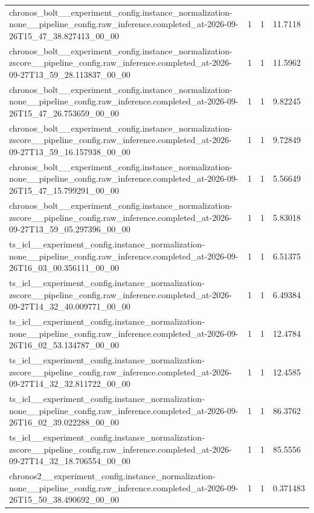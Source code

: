 \begin{tabular}{llll}
chronos\_bolt\_\_experiment\_config.instance\_normalization-none\_\_pipeline\_config.raw\_inference.completed\_at-2026-09-26T15\_47\_38.827413\_00\_00 & 1 & 1 & 11.7118 \\
chronos\_bolt\_\_experiment\_config.instance\_normalization-zscore\_\_pipeline\_config.raw\_inference.completed\_at-2026-09-27T13\_59\_28.113837\_00\_00 & 1 & 1 & 11.5962 \\
chronos\_bolt\_\_experiment\_config.instance\_normalization-none\_\_pipeline\_config.raw\_inference.completed\_at-2026-09-26T15\_47\_26.753659\_00\_00 & 1 & 1 & 9.82245 \\
chronos\_bolt\_\_experiment\_config.instance\_normalization-zscore\_\_pipeline\_config.raw\_inference.completed\_at-2026-09-27T13\_59\_16.157938\_00\_00 & 1 & 1 & 9.72849 \\
chronos\_bolt\_\_experiment\_config.instance\_normalization-none\_\_pipeline\_config.raw\_inference.completed\_at-2026-09-26T15\_47\_15.799291\_00\_00 & 1 & 1 & 5.56649 \\
chronos\_bolt\_\_experiment\_config.instance\_normalization-zscore\_\_pipeline\_config.raw\_inference.completed\_at-2026-09-27T13\_59\_05.297396\_00\_00 & 1 & 1 & 5.83018 \\
ts\_icl\_\_experiment\_config.instance\_normalization-none\_\_pipeline\_config.raw\_inference.completed\_at-2026-09-26T16\_03\_00.356111\_00\_00 & 1 & 1 & 6.51375 \\
ts\_icl\_\_experiment\_config.instance\_normalization-zscore\_\_pipeline\_config.raw\_inference.completed\_at-2026-09-27T14\_32\_40.009771\_00\_00 & 1 & 1 & 6.49384 \\
ts\_icl\_\_experiment\_config.instance\_normalization-none\_\_pipeline\_config.raw\_inference.completed\_at-2026-09-26T16\_02\_53.134787\_00\_00 & 1 & 1 & 12.4784 \\
ts\_icl\_\_experiment\_config.instance\_normalization-zscore\_\_pipeline\_config.raw\_inference.completed\_at-2026-09-27T14\_32\_32.811722\_00\_00 & 1 & 1 & 12.4585 \\
ts\_icl\_\_experiment\_config.instance\_normalization-none\_\_pipeline\_config.raw\_inference.completed\_at-2026-09-26T16\_02\_39.022288\_00\_00 & 1 & 1 & 86.3762 \\
ts\_icl\_\_experiment\_config.instance\_normalization-zscore\_\_pipeline\_config.raw\_inference.completed\_at-2026-09-27T14\_32\_18.706554\_00\_00 & 1 & 1 & 85.5556 \\
chronos2\_\_experiment\_config.instance\_normalization-none\_\_pipeline\_config.raw\_inference.completed\_at-2026-09-26T15\_50\_38.490692\_00\_00 & 1 & 1 & 0.371483 \\

\end{tabular}
